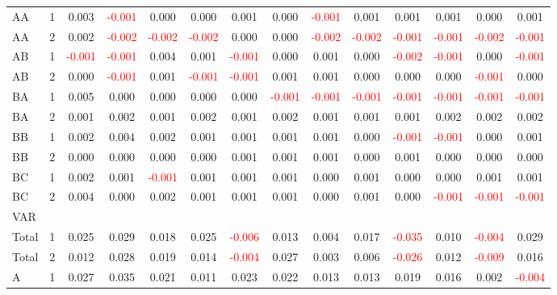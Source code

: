 \begin{table}[H]
{\begin{tabular}{llcccccccccccc}
AA & 1 & 0.003 & \textcolor{red}{-0.001} & 0.000 & 0.000 & 0.001 & 0.000 & \textcolor{red}{-0.001} & 0.001 & 0.001 & 0.001 & 0.000 & 0.001\\
AA & 2 & 0.002 & \textcolor{red}{-0.002} & \textcolor{red}{-0.002} & \textcolor{red}{-0.002} & 0.000 & 0.000 & \textcolor{red}{-0.002} & \textcolor{red}{-0.002} & \textcolor{red}{-0.001} & \textcolor{red}{-0.001} & \textcolor{red}{-0.002} & \textcolor{red}{-0.001}\\
AB & 1 & \textcolor{red}{-0.001} & \textcolor{red}{-0.001} & 0.004 & 0.001 & \textcolor{red}{-0.001} & 0.000 & 0.001 & 0.000 & \textcolor{red}{-0.002} & \textcolor{red}{-0.001} & 0.000 & \textcolor{red}{-0.001}\\
AB & 2 & 0.000 & \textcolor{red}{-0.001} & 0.001 & \textcolor{red}{-0.001} & \textcolor{red}{-0.001} & 0.001 & 0.001 & 0.000 & 0.000 & 0.000 & \textcolor{red}{-0.001} & 0.000\\
BA & 1 & 0.005 & 0.000 & 0.000 & 0.000 & 0.000 & \textcolor{red}{-0.001} & \textcolor{red}{-0.001} & \textcolor{red}{-0.001} & \textcolor{red}{-0.001} & \textcolor{red}{-0.001} & \textcolor{red}{-0.001} & \textcolor{red}{-0.001}\\
BA & 2 & 0.001 & 0.002 & 0.001 & 0.002 & 0.001 & 0.002 & 0.001 & 0.001 & 0.001 & 0.002 & 0.002 & 0.002\\
BB & 1 & 0.002 & 0.004 & 0.002 & 0.001 & 0.001 & 0.001 & 0.001 & 0.000 & \textcolor{red}{-0.001} & \textcolor{red}{-0.001} & 0.000 & 0.001\\
BB & 2 & 0.000 & 0.000 & 0.000 & 0.000 & 0.001 & 0.001 & 0.001 & 0.000 & 0.001 & 0.000 & 0.000 & 0.000\\
BC & 1 & 0.002 & 0.001 & \textcolor{red}{-0.001} & 0.001 & 0.001 & 0.001 & 0.000 & 0.001 & 0.000 & 0.000 & 0.001 & 0.001\\
BC & 2 & 0.004 & 0.000 & 0.002 & 0.001 & 0.001 & 0.001 & 0.000 & 0.001 & 0.000 & \textcolor{red}{-0.001} & \textcolor{red}{-0.001} & \textcolor{red}{-0.001}\\
\hline
VAR &  &  &  &  &  &  &  &  &  &  &  &  & \\
\hline
Total & 1 & 0.025 & 0.029 & 0.018 & 0.025 & \textcolor{red}{-0.006} & 0.013 & 0.004 & 0.017 & \textcolor{red}{-0.035} & 0.010 & \textcolor{red}{-0.004} & 0.029\\
Total & 2 & 0.012 & 0.028 & 0.019 & 0.014 & \textcolor{red}{-0.004} & 0.027 & 0.003 & 0.006 & \textcolor{red}{-0.026} & 0.012 & \textcolor{red}{-0.009} & 0.016\\
A & 1 & 0.027 & 0.035 & 0.021 & 0.011 & 0.023 & 0.022 & 0.013 & 0.013 & 0.019 & 0.016 & 0.002 & \textcolor{red}{-0.004}\\

\end{tabular}}
\end{table}
